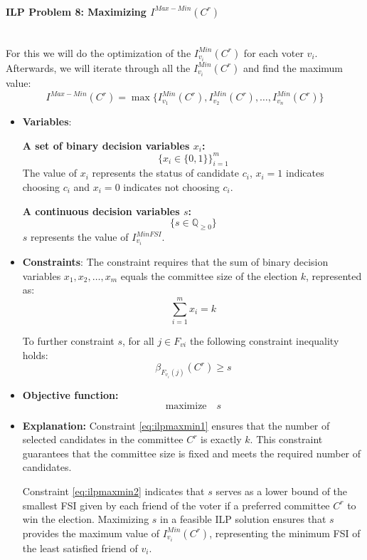 \documentclass{article}
\begin{document}
\paragraph*{ILP Problem 8: Maximizing  $I^{Max-Min}(C^{r})$}\mbox{} \\
For this we will do the optimization of the $I_{v_i}^{Min}(C^{r})$ for each voter $v_i$. Afterwards, we will iterate through all the $I_{v_i}^{Min}(C^{r})$ and find the maximum value:
  \[I^{Max-Min}(C^{r}) = \max\{ I_{v_1}^{Min}(C^{r}), I_{v_2}^{Min}(C^{r}), \ldots, I_{v_n}^{Min}(C^{r}) \}\]
\begin{itemize}
  \item \textbf{Variables}: 

\textbf{A set of binary decision variables $x_i$:} \[ \bigg\{ x_i \in \{0, 1\} \bigg\}_{i=1}^m \] The value of $x_i$ represents the status of candidate $c_i$, \(x_i = 1\) indicates choosing $c_i$ and \(x_i = 0\) indicates not choosing $c_i$.


\textbf{A continuous decision variables $s$:} 
\[ \bigg\{ s\in \mathbb{Q}_{\geq 0} \bigg\}\] 
$s$ represents the value of $I_{v_i}^{MinFSI}$.
    \item \textbf{Constraints}:
The constraint requires that the sum of binary decision variables \(x_1, x_2, \ldots, x_m\) equals the committee size of the election \(k\), represented as:
\begin{equation} \sum_{i=1}^m x_i = k     \label{eq:ilpmaxmin1}
\end{equation}

To further constraint $s$, for all \( j \in F_{vi} \) the following constraint inequality holds:
\begin{equation} \beta_{F_{v_i}(j)}(C^{r}) \geq s  \label{eq:ilpmaxmin2}
\end{equation}
  
  \item  \textbf{Objective function:}
  \[\text{maximize} \quad s\]

  \item  \textbf{Explanation:}
Constraint \ref{eq:ilpmaxmin1} ensures that the number of selected candidates in the committee \(C^r\) is exactly \(k\). This constraint guarantees that the committee size is fixed and meets the required number of candidates.

Constraint \ref{eq:ilpmaxmin2} indicates that \(s\) serves as a lower bound of the smallest FSI given by each friend of the voter if a preferred committee \(C^r\) to win the election. Maximizing \(s\) in a feasible ILP solution ensures that \(s\) provides the maximum value of \(I_{v_i}^{Min}(C^{r})\), representing the minimum FSI of the least satisfied friend of $v_i$. 


\end{itemize}
\end{document}
